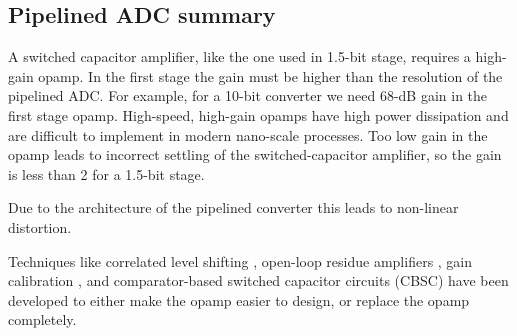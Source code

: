 \subsection{Pipelined ADC summary}
A switched capacitor amplifier, like the one used in 1.5-bit stage,
requires a high-gain opamp. In the first stage the gain must be higher
than the resolution of the pipelined ADC. For example, 
for a 10-bit converter we need 68-dB gain in the first stage
opamp. High-speed, high-gain opamps have high power
dissipation and are difficult to implement in modern nano-scale
processes. Too low gain in the opamp leads to incorrect settling of the
switched-capacitor amplifier, so the gain is less than 2 for a
1.5-bit stage. 

Due to the architecture of the pipelined converter this leads
to non-linear distortion. 

 Techniques like correlated level shifting
\cite{gregoire08}, open-loop residue amplifiers \cite{murmann03}, gain calibration \cite{hernes07}, \cite{mcneill05} and
comparator-based switched capacitor circuits (CBSC)  \cite{sepke06} have been
developed to either make the opamp easier to design, or replace the
opamp completely. 




